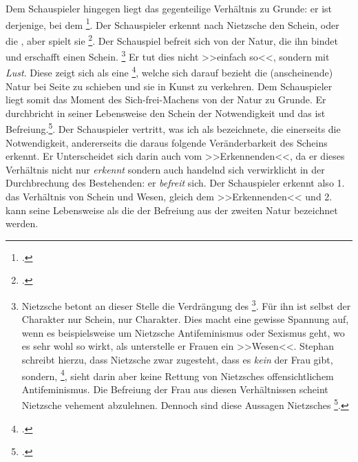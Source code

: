 \documentclass[12pt, a4paper, openany]{report}
\begin{document}
Dem Schauspieler hingegen liegt das gegenteilige Verhältnis zu Grunde: 
er ist derjenige, bei dem \footcite[][596]{nietzsche_morgenrote_1999}.
Der Schauspieler erkennt nach Nietzsche den Schein, oder die , aber spielt sie \footcite[][608]{nietzsche_morgenrote_1999}.
Der Schauspiel befreit sich von der Natur, die ihn bindet und erschafft einen Schein.%
\footnote{
    Nietzsche betont an dieser Stelle die Verdrängung des \footcite[][608]{nietzsche_morgenrote_1999}.
    Für ihn ist selbst der Charakter nur Schein, nur  Charakter.
    Dies macht eine gewisse Spannung auf, wenn es beispielsweise um Nietzsche Antifeminismus oder Sexismus geht, wo es sehr wohl so wirkt, als unterstelle er Frauen ein >>Wesen<<.
    Stephan schreibt hierzu, dass Nietzsche zwar zugesteht, dass es \emph{kein}  der Frau gibt, sondern, \footcite[Vgl.][50]{stephan_nietzscheanismus_2019}, sieht darin aber keine Rettung von Nietzsches offensichtlichem Antifeminismus.
    Die Befreiung der Frau aus diesen Verhältnissen scheint Nietzsche vehement abzulehnen.
    Dennoch sind diese Aussagen Nietzsches \footcite[][61]{stephan_nietzscheanismus_2019}.
}
Er tut dies nicht >>einfach so<<, sondern mit \emph{Lust}.
Diese  zeigt sich als eine \footcite[][608]{nietzsche_morgenrote_1999}, welche sich darauf bezieht die (anscheinende) Natur bei Seite zu schieben und sie in Kunst zu verkehren.
Dem Schauspieler liegt somit das Moment des Sich-frei-Machens von der Natur zu Grunde. 
Er durchbricht in seiner Lebensweise den Schein der Notwendigkeit und das ist Befreiung.\footcite[Vgl.][41]{menke_autonomie_2018}.
Der Schauspieler vertritt, was ich als  bezeichnete, die einerseits die Notwendigkeit, andererseits die daraus folgende Veränderbarkeit des Scheins erkennt.
Er Unterscheidet sich darin auch vom >>Erkennenden<<, da er dieses Verhältnis nicht nur \emph{erkennt} sondern auch handelnd sich verwirklicht in der Durchbrechung des Bestehenden: 
er \emph{befreit} sich.
Der Schauspieler erkennt also 1. das Verhältnis von Schein und Wesen, gleich dem >>Erkennenden<< und 2. kann seine Lebensweise als die der Befreiung aus der zweiten Natur bezeichnet werden. 
\\
\end{document}
